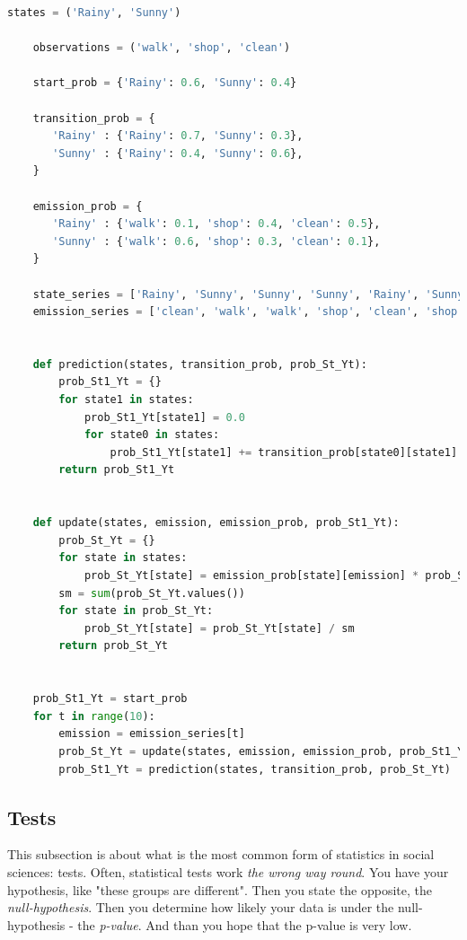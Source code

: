 \begin{lstlisting}[language=python]
    states = ('Rainy', 'Sunny')
     
    observations = ('walk', 'shop', 'clean')
     
    start_prob = {'Rainy': 0.6, 'Sunny': 0.4}
     
    transition_prob = {
       'Rainy' : {'Rainy': 0.7, 'Sunny': 0.3},
       'Sunny' : {'Rainy': 0.4, 'Sunny': 0.6},
    }
     
    emission_prob = {
       'Rainy' : {'walk': 0.1, 'shop': 0.4, 'clean': 0.5},
       'Sunny' : {'walk': 0.6, 'shop': 0.3, 'clean': 0.1},
    }
    
    state_series = ['Rainy', 'Sunny', 'Sunny', 'Sunny', 'Rainy', 'Sunny', 'Rainy', 'Rainy', 'Sunny', 'Sunny', 'Sunny']
    emission_series = ['clean', 'walk', 'walk', 'shop', 'clean', 'shop', 'clean', 'clean', 'clean', 'shop', 'clean']
    
    
    def prediction(states, transition_prob, prob_St_Yt):
        prob_St1_Yt = {}
        for state1 in states:
            prob_St1_Yt[state1] = 0.0
            for state0 in states:
                prob_St1_Yt[state1] += transition_prob[state0][state1] * prob_St_Yt[state0]
        return prob_St1_Yt
    
    
    def update(states, emission, emission_prob, prob_St1_Yt):
        prob_St_Yt = {}
        for state in states:
            prob_St_Yt[state] = emission_prob[state][emission] * prob_St1_Yt[state]
        sm = sum(prob_St_Yt.values())
        for state in prob_St_Yt:
            prob_St_Yt[state] = prob_St_Yt[state] / sm
        return prob_St_Yt
    
            
    prob_St1_Yt = start_prob
    for t in range(10):
        emission = emission_series[t]
        prob_St_Yt = update(states, emission, emission_prob, prob_St1_Yt)
        prob_St1_Yt = prediction(states, transition_prob, prob_St_Yt)
\end{lstlisting}



\subsection{Tests}
This subsection is about what is the most common form of statistics in social sciences: tests.
Often, statistical tests work \emph{the wrong way round}. You have your hypothesis, like "these groups are different". Then you state the opposite, the \emph{null-hypothesis}. Then you determine how likely your data is under the null-hypothesis - the \emph{p-value}. And than you hope that the p-value is very low.

